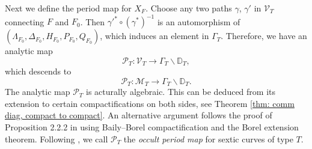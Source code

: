 \documentclass[12pt,reqno,a4paper]{amsart}
\theoremstyle{remark}
\theoremstyle{definition}
\begin{document}
Next we define the period map for $X_F$. Choose any two paths $\gamma$, $\gamma'$ in $\mathcal{V}_T$ connecting $F$ and $F_0$.
Then $\gamma'^*\circ (\gamma^*)^{-1}$ is an automorphism of $(\Lambda_{F_0}, \Delta_{F_0}, H_{F_0}, P_{F_0}, Q_{F_0})$, which induces an element in $\Gamma_T$. Therefore, we have an analytic map
\[
\mathscr{P}_T\colon \mathcal{V}_T\to \Gamma_T\backslash \mathbb{D}_T,
\]
which descends to 
\[
\mathscr{P}_T\colon \mathcal{M}_T\to \Gamma_T\backslash \mathbb{D}_T.
\]
The analytic map $\mathscr{P}_T$ is acturally algebraic. This can be deduced from its extension to certain compactifications on both sides, see Theorem \ref{thm: comm diag, compact to compact}. An alternative argument follows the proof of Proposition 2.2.2 in \cite{hassett2000special} using Baily–Borel compactification and the Borel extension theorem.
Following \cite{kudla2012occult}, we call $\mathscr{P}_T$ the \emph{occult period map} for sextic curves of type $T$.
\end{document}
